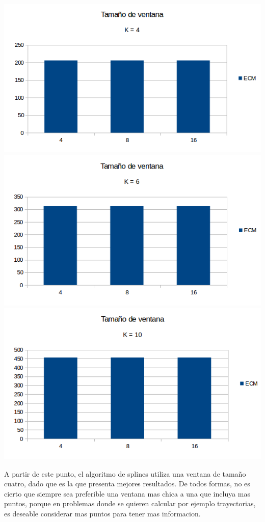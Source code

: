 \begin{center}
\includegraphics[scale=0.50]{imagenes/VK4.png}
\includegraphics[scale=0.50]{imagenes/VK6.png}
\includegraphics[scale=0.50]{imagenes/VK10.png}
\end{center}

A partir de este punto, el algoritmo de splines utiliza una ventana de tamaño cuatro, dado que es la que presenta mejores resultados.
De todos formas, no es cierto que siempre sea preferible una ventana mas chica a una que incluya mas puntos, porque en problemas donde se quieren calcular por ejemplo trayectorias, es deseable considerar mas puntos para tener mas informacion.


